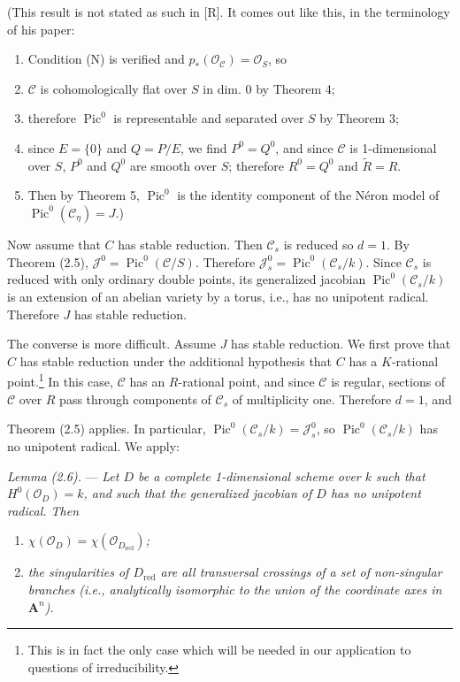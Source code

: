 \documentclass[10pt]{article}
\newcommand{\Pic}{\operatorname{Pic}}
\newcommand{\cO}{\mathcal O}
\newcommand{\A}{\mathbf A}
\begin{document}
(This result is not stated as such in [R]. It comes out like this, in the terminology of his paper:
\begin{enumerate}[label=\emph{\alph*)}]
\item Condition (N) is verified and $p_*(\cO_{\mathscr C})=\cO_S$, so
\item $\mathscr C$ is cohomologically flat over $S$ in dim. 0 by Theorem 4;
\item therefore $\Pic^0$ is representable and separated over $S$ by Theorem 3;
\item since $E=\{0\}$ and $Q=P/E$, we find $P^0=Q^0$, and since $\mathscr C$ is 1-dimensional over $S$, $P^0$ and $Q^0$ are smooth over $S$; therefore $R^0=Q^0$ and $\widetilde R=R$.
\item Then by Theorem 5, $\Pic^0$ is the identity component of the N\'eron model of $\Pic^0(\mathscr C_\eta)=J$.)
\end{enumerate}

Now assume that $C$ has stable reduction. Then $\mathscr C_s$ is reduced so $d=1$. By Theorem (2.5), $\mathscr J^0=\Pic^0(\mathscr C/S)$. Therefore $\mathscr J_s^0=\Pic^0(\mathscr C_s/k)$. Since $\mathscr C_s$ is reduced with only ordinary double points, its generalized jacobian $\Pic^0(\mathscr C_s/k)$ is an extension of an abelian variety by a torus, i.e., has no unipotent radical. Therefore $J$ has stable reduction.

The converse is more difficult. Assume $J$ has stable reduction. We first prove that $C$ has stable reduction under the additional hypothesis that $C$ has a $K$-rational point.\footnote{This is in fact the only case which will be needed in our application to questions of irreducibility.} In this case, $\mathscr C$ has an $R$-rational point, and since $\mathscr C$ is regular, sections of $\mathscr C$ over $R$ pass through components of $\mathscr C_s$ of multiplicity one. Therefore $d=1$, and

Theorem (2.5) applies. In particular, $\Pic^0(\mathscr C_s/k)=\mathscr J_s^0$, so $\Pic^0(\mathscr C_s/k)$ has no unipotent radical. We apply:

\medskip
\noindent\emph{Lemma (2.6).} --- \emph{Let $D$ be a complete 1-dimensional scheme over $k$ such that $H^0(\cO_D)=k$, and such that the generalized jacobian of $D$ has no unipotent radical. Then}
\begin{enumerate}[label=(\roman*)]
\item \emph{$\chi(\cO_D)=\chi(\cO_{D_{\mathrm{red}}})$;}
\item \emph{the singularities of $D_{\mathrm{red}}$ are all transversal crossings of a set of non-singular branches (i.e., analytically isomorphic to the union of the coordinate axes in $\A^n$).}
\end{enumerate}
\end{document}
